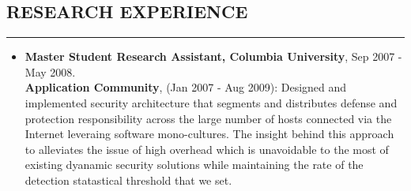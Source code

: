 \documentclass[10pt,a4]{article}
\begin{document}
\begin{small}
\subsection*{RESEARCH EXPERIENCE}
\hrule
\vspace{0.2cm}
\begin{itemize}
\item {\bf Master Student Research Assistant, Columbia University}, Sep 2007 - May 2008. \\
%
  {\bf Application Community}, (Jan 2007 - Aug 2009): Designed and implemented
  security architecture that segments and distributes defense and protection
  responsibility across the large number of hosts connected via the Internet
  leveraing software mono-cultures. The insight behind this approach to
  alleviates the issue of high overhead which is unavoidable to the most of
  existing dyanamic security solutions while maintaining the rate of the
  detection statastical threshold that we set.


\end{itemize}
\end{small}
\end{document}
